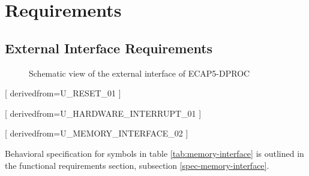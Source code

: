\section{Requirements}

  \subsection{External Interface Requirements}

    \begin{figure}[h!]
        \centering
        
        \caption{Schematic view of the external interface of ECAP5-DPROC}
        \label{fig:externalinterface}
      \end{figure}

    \begin{table}[H]
        \centering
        
        \caption{ECAP5-DPROC control signals}
        \label{tab:control-interface}
      \end{table}

    \begin{table}[H]
        \centering
        
        \caption{ECAP5-DPROC memory interface signals}
        \label{tab:memory-interface}
      \end{table}


    [
        derivedfrom=U\_RESET\_01
      ]


    [
        derivedfrom=U\_HARDWARE\_INTERRUPT\_01
      ]


    [
        derivedfrom=U\_MEMORY\_INTERFACE\_02
      ]

    \begin{content}
        Behavioral specification for symbols in table \ref{tab:memory-interface} is outlined in the functional requirements section, subsection \ref{spec-memory-interface}.
      \end{content}
  
